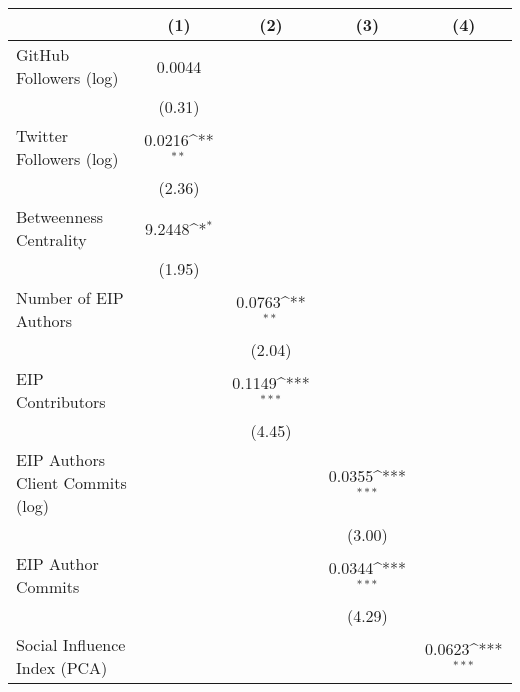 {
\def\sym#1{\ifmmode^{#1}\else\(^{#1}\)\fi}
\begin{tabular}{l*{4}{c}}
\hline\hline
                                   &\multicolumn{1}{c}{(1)}         &\multicolumn{1}{c}{(2)}         &\multicolumn{1}{c}{(3)}         &\multicolumn{1}{c}{(4)}         \\
\hline
GitHub Followers (log)             &    0.0044         &                   &                   &                   \\
                                   &    (0.31)         &                   &                   &                   \\
[1em]
Twitter Followers (log)            &    0.0216\sym{**} &                   &                   &                   \\
                                   &    (2.36)         &                   &                   &                   \\
[1em]
Betweenness Centrality             &    9.2448\sym{*}  &                   &                   &                   \\
                                   &    (1.95)         &                   &                   &                   \\
[1em]
Number of EIP Authors              &                   &    0.0763\sym{**} &                   &                   \\
                                   &                   &    (2.04)         &                   &                   \\
[1em]
EIP Contributors                   &                   &    0.1149\sym{***}&                   &                   \\
                                   &                   &    (4.45)         &                   &                   \\
[1em]
EIP Authors Client Commits (log)   &                   &                   &    0.0355\sym{***}&                   \\
                                   &                   &                   &    (3.00)         &                   \\
[1em]
EIP Author Commits                 &                   &                   &    0.0344\sym{***}&                   \\
                                   &                   &                   &    (4.29)         &                   \\
[1em]
Social Influence Index (PCA)       &                   &                   &                   &    0.0623\sym{***}\\

\end{tabular}}
